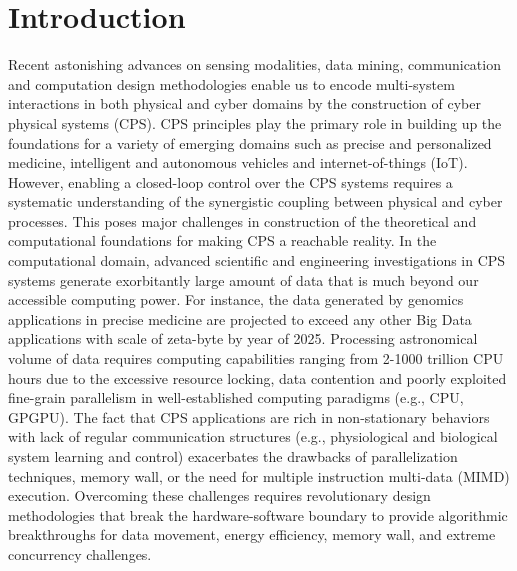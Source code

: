 \chapter{Introduction}
\label{cha:introduction}
Recent astonishing advances on sensing modalities, data mining, communication and computation design methodologies enable us to encode multi-system interactions in both physical and cyber domains by the construction of cyber physical systems (CPS). CPS principles play the primary role in building up the foundations for a variety of emerging domains such as precise and personalized medicine, intelligent and autonomous vehicles and internet-of-things (IoT). However, enabling a closed-loop control over the CPS systems requires a systematic understanding of the synergistic coupling between physical and cyber processes. This poses major challenges in construction of the theoretical and computational foundations for making CPS a reachable reality.
In the computational domain, advanced scientific and engineering investigations in CPS systems generate exorbitantly large amount of data that is much beyond our accessible computing power. For instance, the data generated by genomics applications in precise medicine are projected to exceed any other Big Data applications with scale of zeta-byte by year of 2025. Processing astronomical volume of data requires computing capabilities ranging from 2-1000 trillion CPU hours due to the excessive resource locking, data contention and poorly exploited fine-grain parallelism in well-established computing paradigms (e.g., CPU, GPGPU). The fact that CPS applications are rich in non-stationary behaviors with lack of regular communication structures (e.g., physiological and biological system learning and control) exacerbates the drawbacks of parallelization techniques, memory wall, or the need for multiple instruction multi-data (MIMD) execution. Overcoming these challenges requires revolutionary design methodologies that break the hardware-software boundary to provide algorithmic breakthroughs for data movement, energy efficiency, memory wall, and extreme concurrency challenges. 

